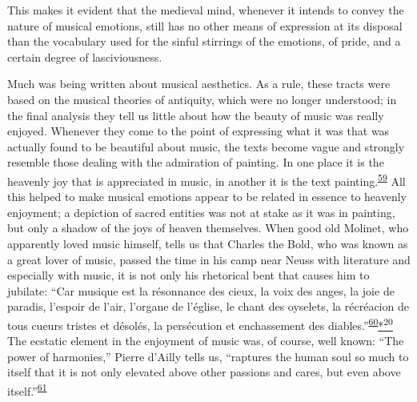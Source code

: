 This makes it evident that the medieval mind, whenever it intends to
convey the nature of musical emotions, still has no other means of
expression at its disposal than the vocabulary used for the sinful
stirrings of the emotions, of pride, and a certain degree of
lasciviousness.

Much was being written about musical aesthetics. As a rule, these tracts
were based on the musical theories of antiquity, which were no longer
understood; in the final analysis they tell us little about how the
beauty of music was really enjoyed. Whenever they come to the point of
expressing what it was that was actually found to be beautiful about
music, the texts become vague and strongly resemble those dealing with
the admiration of painting. In one place it is the heavenly joy that is
appreciated in music, in another it is the text
painting.\textsuperscript{\protect\hypertarget{20_ILLUSTRATIONS_FOLLOW_PAGE.xhtmlux5cux23id_355}{\protect\hyperlink{23_NOTES.xhtmlux5cux23id_356}{59}}}
All this helped to make musical emotions appear to be related in essence
to heavenly enjoyment; a depiction of sacred entities was not at stake
as it was in painting, but only a shadow of the joys of heaven
themselves. When good old Molinet, who apparently loved music himself,
tells us that Charles the Bold, who was known as a great lover of music,
passed the time in his camp near Neuss with literature and especially
with music, it is not only his rhetorical bent that causes him to
jubilate: ``Car musique est la résonnance des cieux, la voix des anges,
la joie de paradis, l'espoir de l'air, l'organe de l'église, le chant
des oyselets, la récréacion de tous cueurs tristes et désolés, la
persécution et enchassement des
diables.''\textsuperscript{\protect\hypertarget{20_ILLUSTRATIONS_FOLLOW_PAGE.xhtmlux5cux23id_353}{\protect\hyperlink{23_NOTES.xhtmlux5cux23id_354}{60}}}\protect\hypertarget{20_ILLUSTRATIONS_FOLLOW_PAGE.xhtmlux5cux23id_2690}{\protect\hyperlink{23_NOTES.xhtmlux5cux23id_2689}{*\textsuperscript{20}}}
The ecstatic element in the enjoyment of music was, of course, well
known: ``The power of harmonies,'' Pierre d'Ailly tells us, ``raptures
the human soul so much to itself that it is not only elevated above
other passions and cares, but even above
itself.''\textsuperscript{\protect\hypertarget{20_ILLUSTRATIONS_FOLLOW_PAGE.xhtmlux5cux23id_351}{\protect\hyperlink{23_NOTES.xhtmlux5cux23id_352}{61}}}

